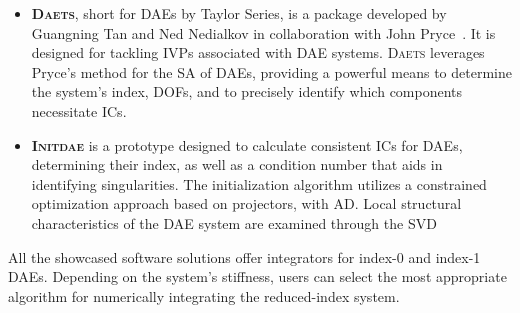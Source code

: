 \begin{itemize}
  \item \textbf{\textsc{Daets}}, short for \acp{DAE} by Taylor Series, is a \cpp{} package developed by Guangning Tan and Ned Nedialkov in collaboration with John Pryce~\cite{nedialkov2007solvingI, nedialkov2007solvingII, nedialkov2008solvingIII}. It is designed for tackling \acp{IVP} associated with \ac{DAE} systems. \textsc{Daets} leverages Pryce's method for the \ac{SA} of \acp{DAE}, providing a powerful means to determine the system's index, \acp{DOF}, and to precisely identify which components necessitate \acp{IC}.
  \item \textbf{\textsc{Initdae}} is a \Python{} prototype designed to calculate consistent \acp{IC} for \acp{DAE}, determining their index, as well as a condition number that aids in identifying singularities. The initialization algorithm utilizes a constrained optimization approach based on projectors, with \ac{AD}. Local structural characteristics of the \ac{DAE} system are examined through the \ac{SVD}~\cite{estvezschwarz2021initdae}
\end{itemize}
%
All the showcased software solutions offer integrators for index-0 and index-1 \acp{DAE}. Depending on the system's stiffness, users can select the most appropriate algorithm for numerically integrating the reduced-index system.

